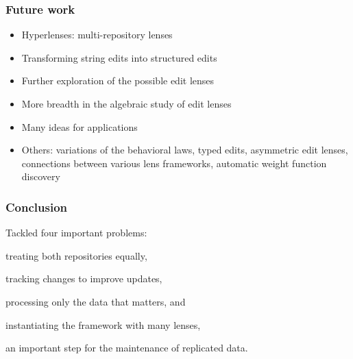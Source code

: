 \documentclass[table]{beamer}
\begin{document}
\begin{frame}
    \frametitle{Future work}
    \begin{itemize}
        \item Hyperlenses: multi-repository lenses
        \item Transforming string edits into structured edits
        \item Further exploration of the possible edit lenses
        \item More breadth in the algebraic study of edit lenses
        \item Many ideas for applications
        \item Others: variations of the behavioral laws, typed edits,
            asymmetric edit lenses, connections between various lens
            frameworks, automatic weight function discovery
    \end{itemize}
\end{frame}

\begin{frame}
    \frametitle{Conclusion}
    Tackled four important problems:
    \begin{description}[Performance,]
        \item[Symmetry,] treating both repositories equally,
        \item[Alignment,] tracking changes to improve updates,
        \item[Performance,] processing only the data that matters, and
        \item[Syntax,] instantiating the framework with many lenses,
    \end{description}
    an important step for the maintenance of replicated data.
\end{frame}

\begin{frame}
    \begin{center}
    \end{center}
\end{frame}
\end{document}
